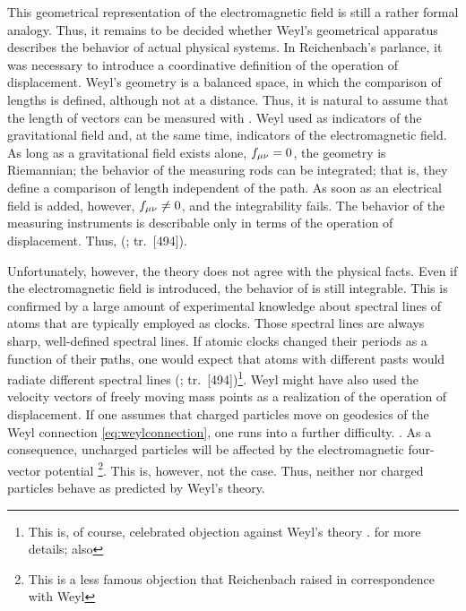 \documentclass[submitted]{article}
\newcommand{\faradaymn}{\ensuremath{f\mn}}
\renewcommand{\rzlap}[2]{(\cite[#1]{Reichenbach1928}; tr.\ [#2])\xspace}
\begin{document}
This geometrical representation of the electromagnetic field is still a rather formal analogy. Thus, it remains to be decided whether Weyl's geometrical apparatus describes the behavior of actual physical systems. In Reichenbach's parlance, it was necessary to introduce a coordinative definition of the operation of displacement. Weyl's geometry is a balanced space, in which the comparison of lengths is defined, although not at a distance. Thus, it is natural to assume that the length of vectors can be measured with \rac. Weyl used \rac as indicators of the gravitational field and, at the same time, indicators of the electromagnetic field. As long as a gravitational field exists alone, $\faradaymn=0$, the geometry is Riemannian; the behavior of the measuring rods can be integrated; that is, they define a comparison of length independent of the path. As soon as an electrical field is added, however, $\faradaymn\neq 0$, and the integrability fails. The behavior of the measuring instruments is describable only in terms of the operation of displacement. Thus,  \rzlap{354}{494}. 

Unfortunately, however, the theory does not agree with the physical facts. Even if the electromagnetic field is introduced, the behavior of \rac is still integrable. This is confirmed by a large amount of experimental knowledge about spectral lines of atoms that are typically employed as clocks. Those spectral lines are always sharp, well-defined spectral lines. If atomic clocks changed their periods as a function of their \st paths, one would expect that atoms with different pasts would radiate different spectral lines \rzlap{355}{494}\footnote{This is, of course, celebrated objection against Weyl's theory .  for more details; also }. Weyl might have also used the velocity vectors of freely moving mass points as a realization of the operation of displacement. If one assumes that charged particles move on geodesics of the Weyl connection \cref{eq:weylconnection}, one runs into a further difficulty. . As a consequence, uncharged particles will be affected by the electromagnetic four-vector potential \footnote{This is a less famous objection that Reichenbach raised in correspondence with Weyl }. This is, however, not the case. Thus, neither \rac nor charged particles behave as predicted by Weyl's theory. 
\end{document}
